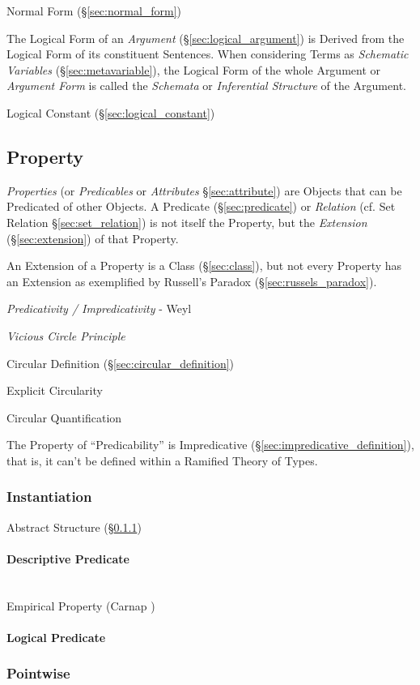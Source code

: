 Normal Form (\S\ref{sec:normal_form})

The Logical Form of an \emph{Argument} (\S\ref{sec:logical_argument})
is Derived from the Logical Form of its constituent Sentences. When
considering Terms as \emph{Schematic Variables}
(\S\ref{sec:metavariable}), the Logical Form of the whole Argument or
\emph{Argument Form} is called the \emph{Schemata} or
\emph{Inferential Structure} of the Argument.



Logical Constant (\S\ref{sec:logical_constant})



\subsection{Property}\label{sec:property}

\emph{Properties} (or \emph{Predicables} or \emph{Attributes}
\S\ref{sec:attribute}) are Objects that can be Predicated of other
Objects. A Predicate (\S\ref{sec:predicate}) or \emph{Relation} (cf.
Set Relation \S\ref{sec:set_relation}) is not itself the Property, but
the \emph{Extension} (\S\ref{sec:extension}) of that Property.

An Extension of a Property is a Class (\S\ref{sec:class}), but not
every Property has an Extension as exemplified by Russell's Paradox
(\S\ref{sec:russels_paradox}).

\emph{Predicativity / Impredicativity} - Weyl

\emph{Vicious Circle Principle}

Circular Definition (\S\ref{sec:circular_definition})

Explicit Circularity

Circular Quantification

The Property of ``Predicability'' is Impredicative
(\S\ref{sec:impredicative_definition}), that is, it can't be defined
within a Ramified Theory of Types.\cite{kleene52}



\subsubsection{Instantiation}\label{sec:instantiation}

Abstract Structure (\S\ref{sec:instantiation})



\paragraph{Descriptive Predicate}\label{sec:descriptive_predicate}
\hfill \\

Empirical Property (Carnap \cite{carnap59})



\paragraph{Logical Predicate}\label{sec:logical_predicate}



\subsubsection{Pointwise}\label{sec:pointwise}
